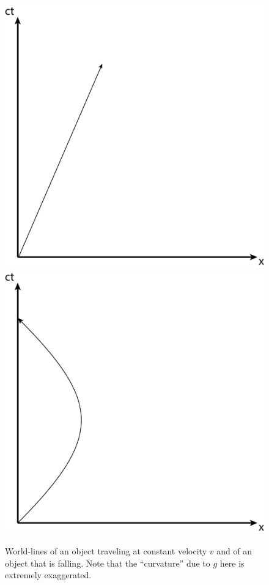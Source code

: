 \documentclass{article}
\theoremstyle{definition}
\begin{document}
\begin{figure}[h!]
	\centering
	\includegraphics[scale=0.15]{gr-fig-2a.png} 
	\includegraphics[scale=0.15]{gr-fig-2b.png}
	\caption{World-lines of an object traveling at constant velocity $v$ and of an object that is falling. Note that the ``curvature'' due to $g$ here is extremely exaggerated.}
\end{figure}
\end{document}
